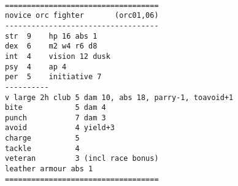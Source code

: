 \


\goodbreak \begin{samepage} \small \begin{verbatim}
===================================
novice orc fighter       (orc01,06)
-----------------------------------
str  9    hp 16 abs 1
dex  6    m2 w4 r6 d8
int  4    vision 12 dusk
psy  4    ap 4
per  5    initiative 7
----------
v large 2h club 5 dam 10, abs 18, parry-1, toavoid+1
bite           	5 dam 4
punch          	7 dam 3
avoid          	4 yield+3
charge         	5
tackle         	4
veteran        	3 (incl race bonus)
leather armour abs 1
===================================
\end{verbatim} \normalsize \end{samepage}








\flushbottom


